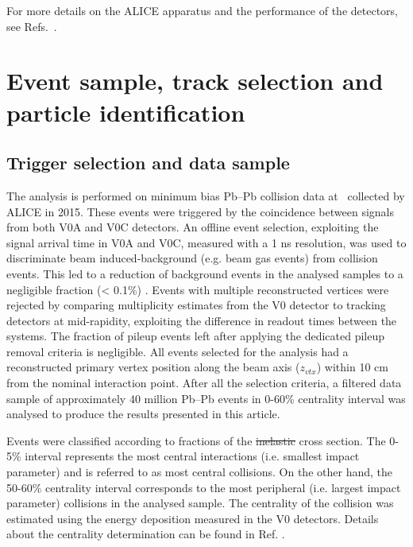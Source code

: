\documentclass[ALICE,manyauthors]{cernphprep}
\providecommand{\DIFaddtex}[1]{{\protect\color{blue}\uwave{#1}}} %
\providecommand{\DIFdeltex}[1]{{\protect\color{red}\sout{#1}}}                      %
\providecommand{\DIFaddbegin}{} %
\providecommand{\DIFaddend}{} %
\providecommand{\DIFdelbegin}{} %
\providecommand{\DIFdelend}{} %
\providecommand{\DIFadd}[1]{\texorpdfstring{\DIFaddtex{#1}}{#1}} %
\providecommand{\DIFdel}[1]{\texorpdfstring{\DIFdeltex{#1}}{}} %
\begin{document}
For more details on the ALICE apparatus and the performance of the detectors, see Refs.~\cite{Aamodt:2008zz,Abelev:2014ffa}.

\newpage
\section{Event sample, track selection and particle identification}
\label{Sec:EventTrackIdentification}
\subsection{Trigger selection and data sample}
\label{SubSec:Event}
The analysis is performed on minimum bias Pb--Pb collision data at \sNN~collected by ALICE in 2015. These events were triggered by the coincidence between signals from both V0A and V0C detectors. An offline event selection, exploiting the signal arrival time in V0A and V0C, measured with a 1 ns resolution, was used to discriminate beam induced-background (e.g. beam gas events) from collision events. This led to a reduction of background events in the analysed samples to a negligible fraction (< 0.1\%) \cite{Abelev:2014ffa}. Events with multiple reconstructed vertices were rejected by comparing multiplicity estimates from the V0 detector to tracking detectors at mid-rapidity, exploiting the difference in readout times between the systems. The fraction of pileup events left after applying the dedicated pileup removal criteria is negligible. All events selected for the analysis had a reconstructed primary vertex position along the beam axis ($z_{vtx}$) within 10 cm from the nominal interaction point. After all the selection criteria, a filtered data sample of approximately 40 million Pb--Pb events in 0-60\% centrality interval was analysed to produce the results presented in this article.

Events were classified according to fractions of the \DIFdelbegin \DIFdel{inelastic }\DIFdelend \DIFaddbegin \DIFadd{total nucleus-nucleus }\DIFaddend cross section. The 0-5\% interval represents the most central interactions (i.e. smallest impact parameter) and is referred to as most central collisions. On the other hand, the 50-60\% centrality interval corresponds to the most peripheral (i.e. largest impact parameter) collisions in the analysed sample. The centrality of the collision was estimated using the energy deposition measured in the V0 detectors. Details about the centrality determination can be found in Ref. \cite{Abelev:2013qoq}.
\end{document}

